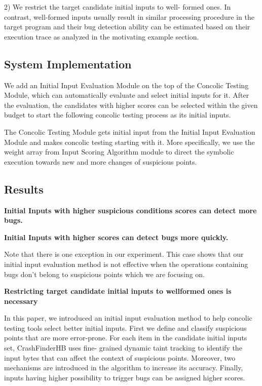 2) We restrict the target candidate initial inputs to well- formed ones.
In contrast, well-formed inputs usually result in similar processing procedure in the target program and their bug detection ability can be estimated based on their execution trace as analyzed in the motivating example section.

\subsection{System Implementation}
We add an Initial Input Evaluation Module on the top of the Concolic Testing Module, which can automatically evaluate and select initial inputs for it.
After the evaluation, the candidates with higher scores can be selected within the given budget to start the following concolic testing process as its initial inputs.

The Concolic Testing Module gets initial input from the Initial Input Evaluation Module and makes concolic testing starting with it.
More specifically, we use the weight array from Input Scoring Algorithm module to direct the symbolic execution towards new and more changes of suspicious points.

\subsection{Results}
\textbf{Initial Inputs with higher suspicious conditions scores can detect more bugs.}

\textbf{Initial Inputs with higher scores can detect bugs more quickly.}

Note that there is one exception in our experiment.
This case shows that our initial input evaluation method is not effective when the operations containing bugs don’t belong to suspicious points which we are focusing on.

\textbf{Restricting target candidate initial inputs to wellformed ones is necessary}

In this paper, we introduced an initial input evaluation method to help concolic testing tools select better initial inputs.
First we define and classify suspicious points that are more error-prone. For each item in the candidate initial inputs set, CrashFinderHB uses fine- grained dynamic taint tracking to identify the input bytes that can affect the context of suspicious points.
Moreover, two mechanisms are introduced in the algorithm to increase its accuracy. Finally, inputs having higher possibility to trigger bugs can be assigned higher scores.
